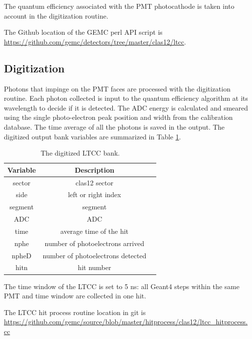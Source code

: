 The quantum efficiency associated with the PMT photocathode is taken into account in
the digitization routine.

The Github location of the GEMC perl API script is  \url{https://github.com/gemc/detectors/tree/master/clas12/ltcc}.


\subsection{Digitization}

Photons that impinge on the PMT faces are processed with the digitization routine.
Each photon collected is input to the quantum efficiency algorithm at its wavelength to decide if it is detected.
The ADC energy is calculated and smeared using the single photo-electron peak position and width from the calibration database.
The time average of all the photons is saved in the output.
The digitized output bank variables are summarized in Table \ref{tab:ltccBank}.

\begin{table}[h]
	\begin{center}
		\begin{tabular}{| c | c | c |}
			\hline \hline
			Variable & Description                                         \\
			\hline
             sector  &                                     clas12 sector   \\
               side  &                               left or right index   \\
            segment  &                                           segment   \\
                ADC  &                                               ADC   \\
               time  &                           average time of the hit   \\
               nphe  &                  number of photoelectrons arrived   \\
              npheD  &                 number of photoelectrons detected   \\
               hitn  &                                        hit number   \\
			\hline \hline
		\end{tabular}
	\end{center}
	\caption{The digitized LTCC bank.}\label{tab:ltccBank}
\end{table}

The time window  of the LTCC is set to 5 ns: all Geant4 steps within the same PMT and time window are collected in one hit.

The LTCC hit process routine location in git is \url{https://github.com/gemc/source/blob/master/hitprocess/clas12/ltcc_hitprocess.cc}
